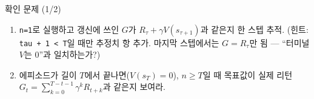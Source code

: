 \begin{frame}{확인 문제 (1/2)}
  \begin{enumerate}
    \item {} \texttt{n=1}로
      실행하고 갱신에 쓰인 $G$가
      $R_\tau + \gamma V(s_{\tau+1})$과 같은지 한 스텝 추적.
      (힌트: \texttt{tau + 1 < T}일 때만 추정치 항 추가. 마지막
      스텝에서는 $G = R_\tau$만 됨 --- ``터미널 $V$는 0''과 일치하는가?)
    \item {} 에피소드가 길이 $T$에서
      끝나면($V(s_T)=0$), $n \ge T$일 때 목표값이 실제 리턴
      $G_t = \sum_{k=0}^{T-t-1} \gamma^k R_{t+k}$과 같은지 보여라.
  \end{enumerate}
\end{frame}
